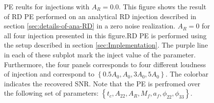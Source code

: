 \begin{figure}
\caption{PE reults for injections with $A_{R} = 0.0$. This figure shows the result of RD PE performed on an analytical RD injection described in section \ref{sec:details-of-ana-RD} in a zero noise realization. $A_{R} =0$ for all four injection presented in this figure.RD PE is performed using the setup described in section \ref{sec:Implementation}. The purple line in each of these subplot mark the inject value of the parameter. Furthermore, the four panels corresponds to four different loudness of injection and correspond to $\left\lbrace 0.5 A_{0}, A_{0}, 3A_{0}, 5A_{0}\right\rbrace $. The colorbar indicates the recovered SNR. Note that the PE is perfromed over the following set of parameters:  $\left\lbrace  t_{c}, A_{22}, A_{R}, M_{f}, a_{f}, \phi_{22}, \phi_{33 } \right\rbrace $. }  
\label{fig:zero}
\end{figure}

